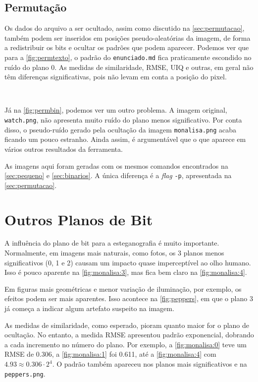\subsection{Permutação}

    Os dados do arquivo a ser ocultado, assim como discutido na \cref{sec:permutacao}, também podem ser inseridos em posições pseudo-aleatórias da imagem, de forma a redistribuir os bits e ocultar os padrões que podem aparecer. Podemos ver que para a \cref{fig:permtexto}, o padrão do \texttt{enunciado.md} fica praticamente escondido no ruído do plano 0. As medidas de similaridade, RMSE, UIQ e outras, em geral não têm diferenças significativas, pois não levam em conta a posição do pixel.

    ~

    

    Já na \cref{fig:permbin}, podemos ver um outro problema. A imagem original, \texttt{watch.png}, não apresenta muito ruído do plano menos significativo. Por conta disso, o pseudo-ruído gerado pela ocultação da imagem \texttt{monalisa.png} acaba ficando um pouco estranho. Ainda assim, é argumentável que o que aparece em vários outros resultados da ferramenta.

    As imagens aqui foram geradas com os mesmos comandos encontrados na \cref{sec:pequeno} e \cref{sec:binarios}. A única diferença é a \textit{flag} \texttt{-p}, apresentada na \cref{sec:permutacao}.

    

\section{Outros Planos de Bit}

    A influência do plano de bit para a esteganografia é muito importante. Normalmente, em imagens mais naturais, como fotos, os 3 planos menos significativos (0, 1 e 2) causam um impacto quase imperceptível ao olho humano. Isso é pouco aparente na \cref{fig:monalisa:3}, mas fica bem claro na \cref{fig:monalisa:4}.

    

    Em figuras mais geométricas e menor variação de iluminação, por exemplo, os efeitos podem ser mais aparentes. Isso acontece na \cref{fig:peppers}, em que o plano 3 já começa a indicar algum artefato suspeito na imagem.

    As medidas de similaridade, como esperado, pioram quanto maior for o plano de ocultação. No entanto, a medida RMSE apresentou padrão exponencial, dobrando a cada incremento no número do plano. Por exemplo, a \cref{fig:monalisa:0} teve um RMSE de 0.306, a \cref{fig:monalisa:1} foi 0.611, até a \cref{fig:monalisa:4} com $4.93 \approx 0.306 \cdot 2^4$. O padrão também apareceu nos planos mais significativos e na \texttt{peppers.png}.

    
